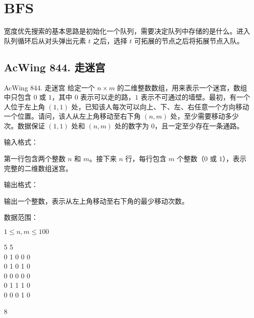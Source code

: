 \section{BFS}

宽度优先搜索的基本思路是初始化一个队列，需要决定队列中存储的是什么。进入队列循环后从对头弹出元素 $t$ 之后，选择 $t$ 可拓展的节点之后将拓展节点入队。

\subsection{AcWing 844. 走迷宫}
\begin{titledbox}{AcWing 844. 走迷宫}
    给定一个 $n \times m$ 的二维整数数组，用来表示一个迷宫，数组中只包含 $0$ 或 $1$，其中 $0$ 表示可以走的路，$1$ 表示不可通过的墙壁。最初，有一个人位于左上角 $(1, 1)$ 处，已知该人每次可以向上、下、左、右任意一个方向移动一个位置。请问，该人从左上角移动至右下角 $(n, m)$ 处，至少需要移动多少次。数据保证 $(1, 1)$ 处和 $(n, m)$ 处的数字为 $0$，且一定至少存在一条通路。

    输入格式：

    第一行包含两个整数 $n$ 和 $m$。接下来 $n$ 行，每行包含 $m$ 个整数（$0$ 或 $1$），表示完整的二维数组迷宫。

    输出格式：

    输出一个整数，表示从左上角移动至右下角的最少移动次数。

    数据范围：

    $1 \le n, m \le 100$

    \begin{inputblock}
        5 5 \\
        0 1 0 0 0 \\
        0 1 0 1 0 \\
        0 0 0 0 0 \\
        0 1 1 1 0 \\
        0 0 0 1 0
    \end{inputblock}
    \begin{outputblock}
        8
    \end{outputblock}
\end{titledbox}

